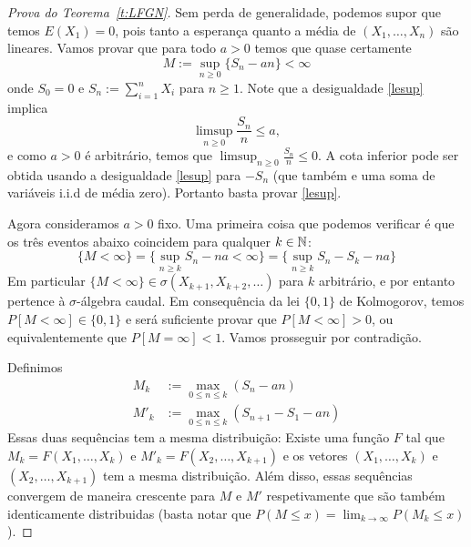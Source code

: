 \begin{proof}[Prova do Teorema~\ref{t:LFGN}]
Sem perda de generalidade, podemos supor que temos $E(X_1) = 0$, pois tanto a esperança quanto a média de $(X_1, \dots, X_n)$ são lineares.
Vamos provar que para todo $a > 0$ temos que quase certamente
\begin{equation}
  \label{lesup}
  M := \sup_{n\ge 0} \big\{ S_n - an \big\} < \infty
\end{equation}
onde $S_0 = 0$ e $S_n := \sum_{i = 1}^n X_i$ para $n \geq 1$.
Note que a desigualdade \eqref{lesup} implica
\begin{equation*}
  \limsup_{n\ge 0} \frac{S_n}{n}\le a,
\end{equation*}
e como $a > 0$ é arbitrário, temos que $\limsup_{n\ge 0} \frac{S_n}{n} \le 0$.
A cota inferior pode ser obtida usando a desigualdade \eqref{lesup} para $-S_n$ (que também e uma soma de variáveis i.i.d de média zero).
Portanto basta provar \cref{lesup}.

\medskip

Agora consideramos $a > 0$ fixo.
Uma primeira coisa que podemos verificar é que os três eventos abaixo coincidem para qualquer $k \in {\ensuremath{\mathbb N}}$:
\begin{equation}
  \{M<\infty\} = \Big\{ \sup_{n\ge k} S_n-n a<\infty \Big\}
  = \Big\{\sup_{n\ge k} S_n-S_k-na \Big\}
\end{equation}
Em particular $\{M<\infty\}\in \sigma(X_{k+1},X_{k+2},\dots )$ para $k$ arbitrário, e por entanto pertence à $\sigma$-álgebra caudal.
Em consequência da lei $\{0,1\}$ de Kolmogorov, temos $P[M < \infty] \in \{0,1\}$ e será suficiente provar que $P[M < \infty] > 0$, ou equivalentemente que
$P[M = \infty] < 1$.
Vamos prosseguir por contradição.

\medskip

Definimos
\begin{equation*}
  \begin{split}
    M_k &:= \max_{0 \le n \le k} (S_n - an)\\
    M'_k &:= \max_{0 \le n \le k} (S_{n+1} - S_1 - an)
  \end{split}
\end{equation*}
Essas duas sequências tem a mesma distribuição: Existe uma função $F$ tal que $M_k = F(X_1, \dots, X_k)$ e $M'_k = F(X_2, \dots, X_{k+1})$ e os vetores $(X_1, \dots, X_k)$ e $(X_2, \dots, X_{k+1})$ tem a mesma distribuição.
Além disso, essas sequências convergem de maneira crescente para $M$ e $M'$ respetivamente que são também identicamente distribuidas (basta notar que $P(M \le x) = \lim_{k \to \infty} P(M_k \le x)$).


\end{proof}
